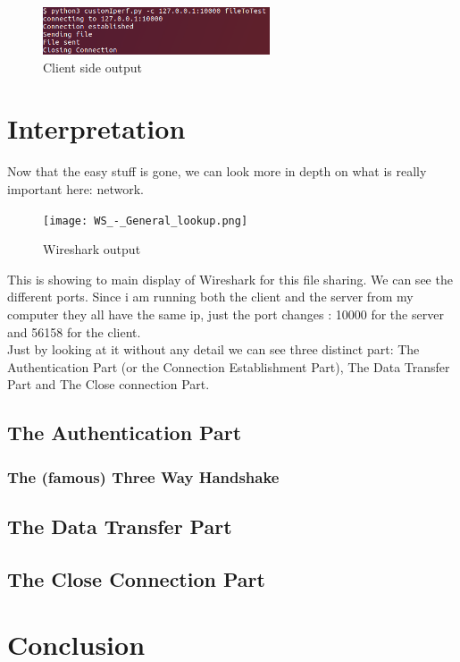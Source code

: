 \documentclass[a4paper]{article}
\begin{document}
\begin{figure}
\centering
\includegraphics[width=0.6\textwidth]{clientSide.png}
\caption{Client side output}
\end{figure}

\newpage
\section{Interpretation}

\par Now that the easy stuff is gone, we can look more in depth on what is really important here: network.

\begin{figure}
\centering
\texttt{[image: WS\_-\_General\_lookup.png]}
\caption{Wireshark output}
\end{figure}

This is showing to main display of Wireshark for this file sharing.
We can see the different ports.
Since i am running both the client and the server from my computer they all have the same ip, just the port changes : 10000 for the server and 56158 for the client.\\
Just by looking at it without any detail we can see three distinct part: The Authentication Part (or the Connection Establishment Part), The Data Transfer Part and The Close connection Part.

\subsection{The Authentication Part}

\subsubsection{The (famous) Three Way Handshake}

\subsection{The Data Transfer Part}

\subsection{The Close Connection Part}

\newpage 
\section{Conclusion}

\newpage

\listoffigures
\end{document}
